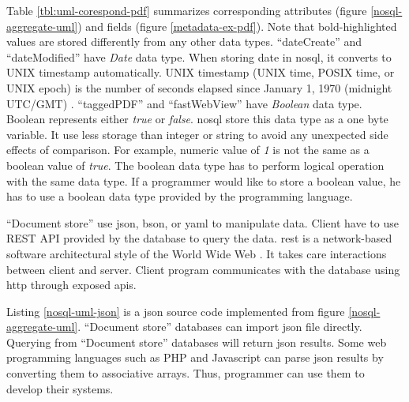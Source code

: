 Table \ref{tbl:uml-corespond-pdf} summarizes corresponding attributes (figure \ref{nosql-aggregate-uml}) and fields (figure \ref{metadata-ex-pdf}).
Note that bold-highlighted values are stored differently from any other data types.
\enquote{dateCreate} and \enquote{dateModified} have \textit{Date} data type.
When storing date in \gls{nosql}, it converts to UNIX timestamp automatically.
UNIX timestamp (UNIX time, POSIX time, or UNIX epoch) is the number of seconds elapsed since January 1, 1970 (midnight UTC/GMT) \cite{unix-time}.
\enquote{taggedPDF} and \enquote{fastWebView} have \textit{Boolean} data type.
Boolean represents either \textit{true} or \textit{false}.
\gls{nosql} store this data type as a one byte variable.
It use less storage than integer or string to avoid any unexpected side effects of comparison. 
For example, numeric value of \textit{1} is not the same as a boolean value of \textit{true}.
The boolean data type has to perform logical operation with the same data type.
If a programmer would like to store a boolean value, he has to use a boolean data type provided by the programming language.

\enquote{Document store} use \gls{json}, \gls{bson}, or \gls{yaml} to manipulate data.
Client have to use REST API provided by the database to query the data.
\gls{rest} is a network-based software architectural style of the World Wide Web \cite{doglio, masse_2012}.
It takes care interactions between client and server.
Client program communicates with the database using \gls{http} through exposed \glspl{api}.

Listing \ref{nosql-uml-json} is a \gls{json} source code implemented from figure \ref{nosql-aggregate-uml}.
\enquote{Document store} databases can import \gls{json} file directly.
Querying from \enquote{Document store} databases will return \gls{json} results.
Some web programming languages such as PHP and Javascript can parse \gls{json} results by converting them to associative arrays.
Thus, programmer can use them to develop their systems.
\begin{normalsize}

\end{normalsize}

